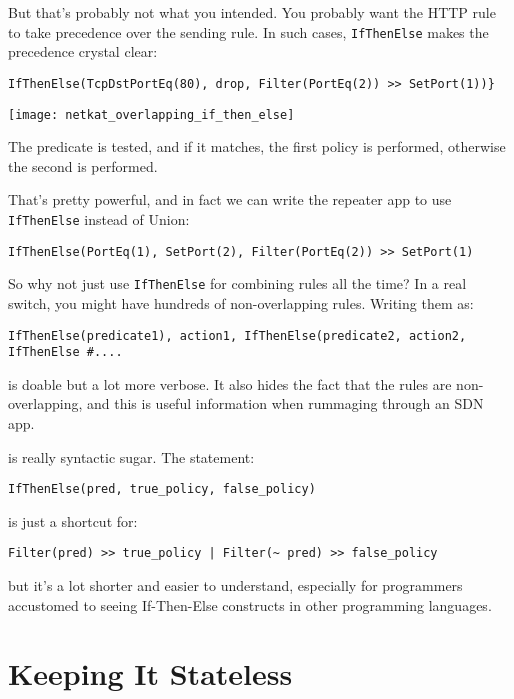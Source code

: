 But that's probably not what you intended.  You probably want the HTTP rule to take precedence over the
sending rule.  In such cases,
\texttt{IfThenElse} makes the precedence crystal clear:

\begin{verbatim}
IfThenElse(TcpDstPortEq(80), drop, Filter(PortEq(2)) >> SetPort(1))}
\end{verbatim}

\texttt{[image: netkat\_overlapping\_if\_then\_else]}

The predicate is tested, and if it matches, the first policy is performed, otherwise the second is performed.

That's pretty powerful, and in fact we can write the repeater app to use \texttt{IfThenElse} instead of Union:

\begin{verbatim}
IfThenElse(PortEq(1), SetPort(2), Filter(PortEq(2)) >> SetPort(1) 
\end{verbatim}

So why not just use \texttt{IfThenElse} for combining rules all the time?  In a real switch, you might have 
hundreds of non-overlapping rules.  Writing them as:

\begin{verbatim}
IfThenElse(predicate1), action1, IfThenElse(predicate2, action2, IfThenElse #....
\end{verbatim}

is doable but a lot more verbose.  It also hides the fact that the rules are non-overlapping, and this is useful
information when rummaging through an SDN app. 

 is really syntactic sugar.  The statement:

\begin{verbatim}
IfThenElse(pred, true_policy, false_policy)
\end{verbatim}

is just a shortcut for:

\begin{verbatim}
Filter(pred) >> true_policy | Filter(~ pred) >> false_policy
\end{verbatim}

but it's a lot shorter and easier to understand, especially for programmers accustomed to seeing If-Then-Else
constructs in other programming languages.

\section{Keeping It Stateless}
\label{section:stateless}

